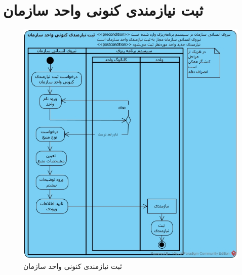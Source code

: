 \section{ثبت نیازمندی کنونی واحد سازمان}
\begin{figure}[H]
	\centering
	\includegraphics[scale=0.7]{img/activity/AddRequirementToUnit}
	\caption{ثبت نیازمندی کنونی واحد سازمان}
\end{figure}


